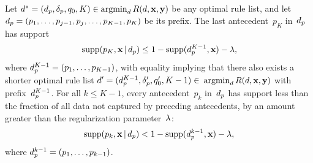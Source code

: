 \begin{theorem}
\label{thm:ub-support}
Let ${{d}^* = (d_p, \delta_p, q_0, K) \in \operatorname*{argmin}_{d} R({d}, \mathbf{x}, \mathbf{y})}$
be any optimal rule list, and let
${d_p = (p_1, \dots, p_{j-1}, p_j, \dots, p_{K-1}, p_K)}$ be its prefix.
%
The last antecedent~$p_K$ in~$d_p$ has support
\begin{align}
\Supp(p_K, \x \given \Prefix) \le 1 - \Supp(\Prefix^{K-1}, \x) - \Reg,
\label{eq:ub-support-last}
\end{align}
where ${d_p^{K-1} = (p_1, \dots, p_{K-1})}$,
with equality implying that there also exists a shorter optimal rule list
${{d}' = (d_p^{K-1}, \delta_p', q_0', K - 1) \in}$ ${\operatorname*{argmin}_{d} R({d}, \mathbf{x}, \mathbf{y})}$
with prefix~$d_p^{K-1}$.
%
For all ${k \le K - 1}$, every antecedent~$p_k$ in~$d_p$ has support
less than the fraction of all data not captured by preceding antecedents,
by an amount greater than the regularization parameter~${\lambda}$:
\begin{align}
\Supp(p_k, \x \given \Prefix) < 1 - \Supp(\Prefix^{k-1}, \x) - \Reg,
\label{eq:ub-support}
\end{align}
where ${d_p^{k-1} = (p_1, \dots, p_{k-1})}$.
\end{theorem}

